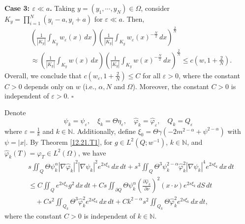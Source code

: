 \documentclass[11pt]{article}
\newenvironment{proof}{{\bf {Proof.}}}{\hfill $\square$}
\numberwithin{equation}{section}
\def\bf{\textbf}
\begin{document}
\begin{proof}
\textbf{Case 3: $\varepsilon \ll a$.}
Taking $y=(y_1,\cdots,y_N)\in \Omega$, consider $K_y=\prod_{i=1}^N(y_i-a,y_i+a)$ for $\varepsilon \ll a$. Then,
\begin{equation*}
\begin{split}
&\left(\frac{1}{|K_y|}\int_{K_y} w_\varepsilon(x) \, dx\right)\left(\frac{1}{|K_y|}\int_{K_y} w_\varepsilon(x)^{-\frac{N}{2}} \, dx\right)^{\frac{2}{N}} \\
&\approx \left(\frac{1}{|K_y|}\int_{K_y} w(x) \, dx\right)\left(\frac{1}{|K_y|}\int_{K_y} w(x)^{-\frac{N}{2}} \, dx\right)^{\frac{2}{N}} \leq c\left(w,1+\frac{2}{N}\right).
\end{split}
\end{equation*}
Overall, we conclude that $c(w_\varepsilon, 1+\frac{2}{N}) \leq C$ for all $\varepsilon > 0$, where the constant $C > 0$ depends only on $w$ (i.e., $\alpha, N$ and $\Omega$). Moreover, the constant $C > 0$ is independent of $\varepsilon > 0$.
\end{proof}



  Denote
\begin{equation*}
\psi_k = \psi_\varepsilon, \quad \xi_k = \Theta \eta_\varepsilon, \quad \widehat{\varphi}_k = \widehat{\varphi}_\varepsilon, \quad Q_k = Q_\varepsilon
\end{equation*}
where $\varepsilon = \frac{1}{k}$ and $k \in \mathbb{N}$. Additionally, define $\xi_0 = \Theta \gamma(-2m^{2-\alpha} + \psi^{2-\alpha})$ with $\psi = |x|$.
By Theorem \ref{12.21.T1}, for $g \in L^2(Q;w^{-1})$, $k \in \mathbb{N}$, and $\widehat{\varphi}_k(T) = \varphi_T \in L^2(\Omega)$, we have
\begin{equation}\label{12.22.1}
\begin{split}
&s\iint_Q \Theta \psi_k^\alpha |\nabla \widehat{\varphi}_k|^2|\nabla \psi_k|^2 e^{2s\xi_k} \, dx \, dt + s^3\iint_Q \Theta^3\psi_k^{2-\alpha} \widehat{\varphi}_k^2|\nabla\psi_k|^4e^{2s\xi_k} \, dx \, dt\\
&\leq C\iint_Q e^{2s\xi_k}g^2 \, dx \, dt + Cs\iint_{\partial Q} \Theta \psi_k^\alpha \left(\frac{\partial \widehat{\varphi}_k}{\partial \nu}\right)^2(x \cdot \nu)e^{2s\xi_k} \, dS \, dt\\
&\quad +Cs^2\iint_{Q_k}\Theta^3\widehat{\varphi}_k^2 e^{2s\xi_k} \, dx \, dt + Ck^{2-\alpha}s^2\iint_{Q_k}\Theta \widehat{\varphi}_k^2e^{2s\xi_k} \, dx \, dt,
\end{split}
\end{equation}
where the constant $C > 0$ is independent of $k \in \mathbb{N}$.
\end{document}
